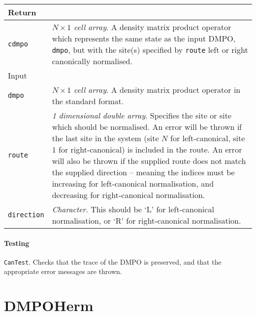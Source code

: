  \begin{longtabu}{X[1,1]X[4,1]}
 \hline
 Return & \\ \hline
 \lstinline$cdmpo$ & \emph{\(N \times 1\) cell array}. A density matrix product operator which represents the same state as the input DMPO, \lstinline$dmpo$, but with the site(s) specified by \lstinline$route$ left or right canonically normalised. \\ \hline
 Input & \\ \hline
 \lstinline$dmpo$ & \emph{\(N \times 1\) cell array}. A density matrix product operator in the standard format. \\
 \lstinline$route$ & \emph{1 dimensional double array}. Specifies the site or site which should be normalised. An error will be thrown if the last site in the system (site \(N\) for left-canonical, site \(1\) for right-canonical) is included in the route. An error will also be thrown if the supplied route does not match the supplied direction -- meaning the indices must be increasing for left-canonical normalisation, and decreasing for right-canonical normalisation. \\
 \lstinline$direction$ & \emph{Character}. This should be `L' for left-canonical normalisation, or `R' for right-canonical normalisation. \\
 \hline
 \end{longtabu}
 \paragraph{Testing} \lstinline$CanTest$. Checks that the trace of the DMPO is preserved, and that the appropriate error messages are thrown.

 \section{DMPOHerm}
